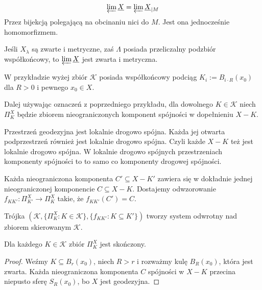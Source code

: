 \begin{fact}{}{}
  $$\varprojlim\underline{X}=\varprojlim\underline{X}_{|M}$$
  Przez bijekcją polegającą na obcinaniu nici do $M$. Jest ona jednocześnie homomorfizmem.
\end{fact}

\begin{conclusion}{}{} 
  Jeśli $X_\lambda$ są zwarte i metryczne, zaś $\Lambda$ posiada przeliczalny podzbiór współkońcowy, to $\varprojlim\underline{X}$ jest zwarta i metryczna.
\end{conclusion}

\begin{example}[m]
  \item W przykładzie wyżej zbiór $\mathcal{K}$ posiada współkońcowy podciąg $K_i:=B_{i\cdot R}(x_0)$ dla $R>0$ i pewnego $x_0\in X$.
  \item Dalej używając oznaczeń z poprzedniego przykładu, dla dowolnego $K\in\mathcal{K}$ niech $\Pi_K^X$ będzie zbiorem nieograniczonych komponent spójności w dopełnieniu $X-K$.\medskip

    Przestrzeń geodezyjna jest lokalnie drogowo spójna. Każda jej otwarta podprzestrzeń również jest lokalnie drogowo spójna. Czyli każde $X-K$ też jest lokalnie drogowo spójna. W lokalnie drogowo spójnych przestrzeniach komponenty spójności to to samo co komponenty drogowej spójności.\medskip 

    Każda nieograniczona komponenta $C'\subseteq X-K'$ zawiera się w dokładnie jednej nieograniczonej komponencie $C\subseteq X-K$. Dostajemy odwzorowanie $f_{KK'}:\Pi_{K'}^X\to \Pi_K^X$ takie, że $f_{KK'}(C')=C$.\medskip
  
    Trójka $(\mathcal{K}, \{\Pi_K^X:K\in\mathcal{K}\}, \{f_{KK'}:K\subseteq K'\})$ tworzy system odwrotny nad zbiorem skierowanym $\mathcal{K}$.

    \begin{center}
    \end{center}

    \begin{fact}{}{}
      Dla każdego $K\in\mathcal{K}$ zbiór $\Pi_K^X$ jest skończony.
    \end{fact}

    \begin{proof}
      Weźmy $K\subseteq B_r(x_0)$, niech $R>r$ i rozważmy kulę $B_R(x_0)$, która jest zwarta. Każda nieograniczona komponenta $C$ spójności w $X-K$ przecina niepusto sferę $S_R(x_0)$, bo $X$ jest geodezyjna.


\end{proof}
\end{example}
